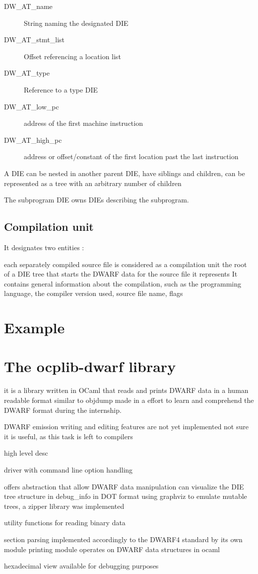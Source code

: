 \begin{description}
    \item[DW\_AT\_name] String naming the designated DIE
    \item[DW\_AT\_stmt\_list] Offset referencing a location list
    \item[DW\_AT\_type] Reference to a type DIE
    \item[DW\_AT\_low\_pc] address of the first machine instruction
    \item[DW\_AT\_high\_pc] address or offset/constant of the first location past the last instruction
\end{description}

A DIE can be nested in another parent DIE, have siblings and children,
can be represented as a tree with an arbitrary number of children

The subprogram DIE owns DIEs describing the subprogram.

\subsection{Compilation unit}

It designates two entities :

each separately compiled source file is considered as a compilation unit
the root of a DIE tree that starts the DWARF data for the source file it represents
It contains general information about the compilation,
such as the programming language, the compiler version used, source file name, flags

\section{Example}

\section{The ocplib-dwarf library}

it is a library written in OCaml that reads and prints DWARF data in a human readable format similar to objdump
made in a effort to learn and comprehend the DWARF format during the internship.

DWARF emission writing and editing features are not yet implemented
not sure it is useful, as this task is left to compilers

high level desc


driver with command line option handling

offers abstraction that allow DWARF data manipulation
can visualize the DIE tree structure in debug\_info in DOT format using graphviz
to emulate mutable trees, a zipper library was implemented

utility functions for reading binary data

section parsing implemented accordingly to the DWARF4 standard by its own module
printing module operates on DWARF data structures in ocaml

hexadecimal view available for debugging purposes


